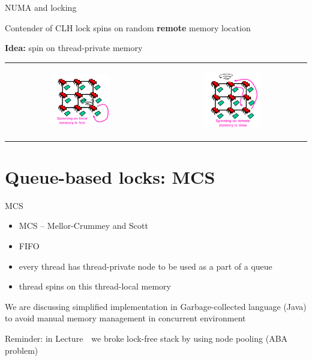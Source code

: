 \begin{frame}{NUMA and locking}

Contender of CLH lock spins on random \textbf{remote} memory location

\textbf{Idea:} spin on thread-private memory

\begin{tabular}{cc}
\begin{center} \includegraphics[width=0.4\textwidth]{./pics/numa/148.png} \end{center} 
&
\begin{center} \includegraphics[width=0.4\textwidth]{./pics/numa/149.png} \end{center} 
\end{tabular}
\end{frame}

\section{Queue-based locks: MCS}
\showTOC

\begin{frame}{MCS}

\begin{itemize}
  \item MCS -- Mellor-Crummey and Scott
  \item FIFO
  \item every thread has thread-private node to be used as a part of a queue
  \item thread spins on this thread-local memory
\end{itemize}  

\pause
We are discussing simplified implementation in Garbage-collected language (Java) to avoid manual memory management in concurrent environment

\pause
Reminder: in Lecture~\atomicsNum \ we broke lock-free stack by using node pooling (ABA problem)
\end{frame}

